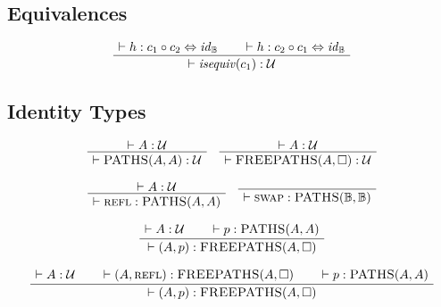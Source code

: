 \documentclass[format=acmlarge,review,natbib]{acmart}
\newcommand{\patht}[1]{\textsc{PATHS}(#1,#1)}
\newcommand{\fpatht}[1]{\textsc{FREEPATHS}(#1,\Box)}
\newcommand{\compc}{\circ}
\newcommand{\reflp}{\textsc{refl}}
\newcommand{\swapp}{\textsc{swap}}
\newcommand{\isequiv}[1]{\mathit{isequiv}(#1)}
\newcommand{\idc}{\mathit{id}}
\newcommand{\isotwo}{\Leftrightarrow}
\newcommand{\boolt}{\mathbb{B}}
\newcommand{\univ}{\mathcal{U}}
\newcommand{\proves}{\vdash}
\newcommand{\jdg}[2]{\proves #1 : #2}
\begin{document}
\subsection{Equivalences}

\[\begin{array}{c}
  \AxiomC{$\jdg{h}{c_1\compc c_2 \isotwo \idc_{\boolt}}$}
  \AxiomC{$\jdg{h}{c_2\compc c_1 \isotwo \idc_{\boolt}}$}
  \BinaryInfC{$\jdg{\isequiv{c_1}}{\univ}$}
  \DisplayProof
\end{array}\]

\subsection{Identity Types}

\[\begin{array}{c}
  \AxiomC{$\jdg{A}{\univ}$}
  \UnaryInfC{$\jdg{\patht{A}}{\univ}$}
  \DisplayProof
\quad
  \AxiomC{$\jdg{A}{\univ}$}
  \UnaryInfC{$\jdg{\fpatht{A}}{\univ}$}
  \DisplayProof
\\
\\
  \AxiomC{$\jdg{A}{\univ}$}
  \UnaryInfC{$\jdg{\reflp}{\patht{A}}$}
  \DisplayProof
\quad
  \AxiomC{}
  \UnaryInfC{$\jdg{\swapp}{\patht{\boolt}}$}
  \DisplayProof
\\
\\
  \AxiomC{$\jdg{A}{\univ}$}
  \AxiomC{$\jdg{p}{\patht{A}}$}
  \BinaryInfC{$\jdg{(A,p)}{\fpatht{A}}$}
  \DisplayProof
\\
\\
  \AxiomC{$\jdg{A}{\univ}$}
  \AxiomC{$\jdg{(A,\reflp)}{\fpatht{A}}$}
  \AxiomC{$\jdg{p}{\patht{A}}$}
  \TrinaryInfC{$\jdg{(A,p)}{\fpatht{A}}$}
  \DisplayProof
\end{array}\]

\newpage
\end{document}
